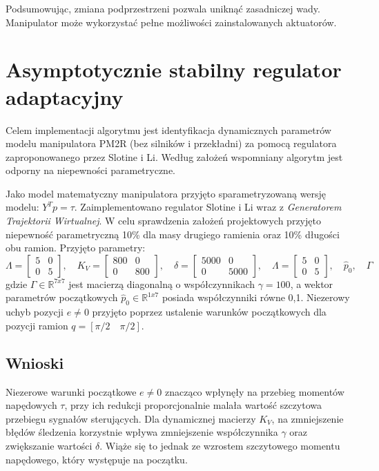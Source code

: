\documentclass[10pt, a4paper, polish]{article}
\begin{document}
Podsumowując, zmiana podprzestrzeni pozwala uniknąć zasadniczej wady. Manipulator może wykorzystać pełne możliwości zainstalowanych aktuatorów.

\section{Asymptotycznie stabilny regulator adaptacyjny}
Celem implementacji algorytmu jest identyfikacja dynamicznych parametrów modelu manipulatora PM2R (bez silników i przekładni) za pomocą regulatora zaproponowanego przez Slotine i Li. Według założeń wspomniany algorytm jest odporny na niepewności parametryczne.

Jako model matematyczny manipulatora przyjęto sparametryzowaną wersję modelu: $Y^Tp=\tau$. Zaimplementowano regulator Slotine i Li wraz z \textit{Generatorem Trajektorii Wirtualnej}. W celu sprawdzenia założeń projektowych przyjęto niepewność parametryczną 10\% dla masy drugiego ramienia oraz 10\% długości obu ramion. Przyjęto parametry:\begin{equation}
\Lambda=\begin{bmatrix}5 & 0 \\ 0 & 5\end{bmatrix},\quad K_V=\begin{bmatrix}800 & 0 \\ 0 & 800\end{bmatrix}, \quad \delta=\begin{bmatrix}5000 & 0 \\ 0 & 5000\end{bmatrix},\quad \Lambda=\begin{bmatrix}5 & 0 \\ 0 & 5\end{bmatrix},\quad \hat{p}_0,\quad\Gamma\end{equation}
gdzie $\Gamma \in \mathbb{R}^{7x7}$ jest macierzą diagonalną o współczynnikach $\gamma=100$, a wektor parametrów początkowych $\hat{p}_0\in\mathbb{R}^{1x7}$ posiada współczynniki równe 0,1. Niezerowy uchyb pozycji $e\neq0$ przyjęto poprzez ustalenie warunków początkowych dla pozycji ramion $q=[\pi/2\quad \pi/2]$. 

\subsection{Wnioski}
Niezerowe warunki początkowe $e\neq0$ znacząco wpłynęły na przebieg momentów napędowych $\tau$, przy ich redukcji proporcjonalnie malała wartość szczytowa przebiegu sygnałów sterujących. 
Dla dynamicznej macierzy $K_V$, na zmniejszenie błędów śledzenia korzystnie wpływa zmniejszenie współczynnika $\gamma$ oraz zwiększanie wartości $\delta$. Wiąże się to jednak ze wzrostem szczytowego momentu napędowego, który występuje na początku.
\end{document}
